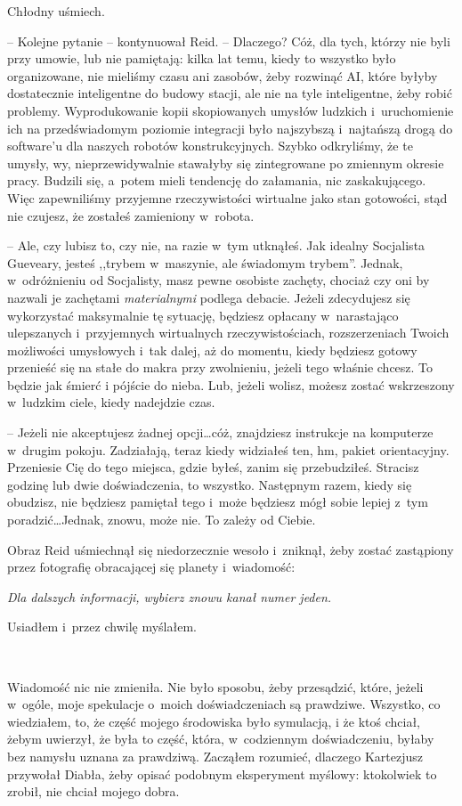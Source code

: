 \documentclass[oneside,polish,11pt,sfheadings]{mwbk}
\begin{document}
Chłodny uśmiech.

-- Kolejne pytanie -- kontynuował Reid. -- Dlaczego? Cóż, dla tych, którzy
nie byli przy umowie, lub nie pamiętają: kilka lat temu, kiedy to
wszystko było organizowane, nie mieliśmy czasu ani zasobów, żeby
rozwinąć AI, które byłyby dostatecznie inteligentne do budowy stacji,
ale nie na tyle inteligentne, żeby robić problemy. Wyprodukowanie kopii
skopiowanych umysłów ludzkich i~uruchomienie ich na przedświadomym
poziomie integracji było najszybszą i~najtańszą drogą do software'u dla
naszych robotów konstrukcyjnych. Szybko odkryliśmy, że te umysły, wy, nieprzewidywalnie stawałyby się zintegrowane po zmiennym okresie pracy.
Budzili się, a~potem mieli tendencję do załamania, nic zaskakującego.
Więc zapewniliśmy przyjemne rzeczywistości wirtualne jako stan
gotowości, stąd nie czujesz, że zostałeś zamieniony w~robota.

-- Ale, czy lubisz to, czy nie, na razie w~tym utknąłeś. Jak idealny
Socjalista Gueveary, jesteś ,,trybem w~maszynie, ale świadomym trybem''.
Jednak, w~odróżnieniu od Socjalisty, masz pewne osobiste zachęty,
chociaż czy oni by nazwali je zachętami \emph{materialnymi} podlega
debacie. Jeżeli zdecydujesz się wykorzystać maksymalnie tę sytuację,
będziesz opłacany w~narastająco ulepszanych i~przyjemnych wirtualnych
rzeczywistościach, rozszerzeniach Twoich możliwości umysłowych i~tak
dalej, aż do momentu, kiedy będziesz gotowy przenieść się na stałe do
makra przy zwolnieniu, jeżeli tego właśnie chcesz. To będzie jak śmierć
i pójście do nieba. Lub, jeżeli wolisz, możesz zostać wskrzeszony w~ludzkim ciele, kiedy nadejdzie czas.

-- Jeżeli nie akceptujesz żadnej opcji\ldots cóż, znajdziesz instrukcje na
komputerze w~drugim pokoju. Zadziałają, teraz kiedy widziałeś ten, hm,
pakiet orientacyjny. Przeniesie Cię do tego miejsca, gdzie byłeś, zanim
się przebudziłeś. Stracisz godzinę lub dwie doświadczenia, to wszystko.
Następnym razem, kiedy się obudzisz, nie będziesz pamiętał tego i~może
będziesz mógł sobie lepiej z~tym poradzić\ldots Jednak, znowu, może nie. To
zależy od Ciebie.

Obraz Reid uśmiechnął się niedorzecznie wesoło i~zniknął, żeby zostać
zastąpiony przez fotografię obracającej się planety i~wiadomość:

\emph{Dla dalszych informacji, wybierz znowu kanał numer jeden.}

Usiadłem i~przez chwilę myślałem.

~

Wiadomość nic nie zmieniła. Nie było sposobu, żeby przesądzić, które,
jeżeli w~ogóle, moje spekulacje o~moich doświadczeniach są prawdziwe.
Wszystko, co wiedziałem, to, że część mojego środowiska było symulacją,
i że ktoś chciał, żebym uwierzył, że była to część, która, w~codziennym
doświadczeniu, byłaby bez namysłu uznana za prawdziwą. Zacząłem
rozumieć, dlaczego Kartezjusz przywołał Diabła, żeby opisać podobnym
eksperyment myślowy: ktokolwiek to zrobił, nie chciał mojego dobra.
\end{document}
